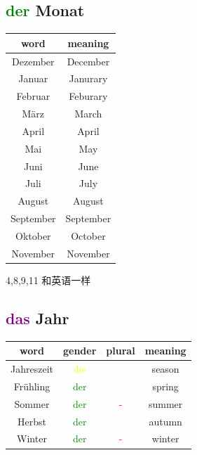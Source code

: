 \subsection{\textcolor{green}{der} Monat}
\begin{center}
    \begin{tabular}{|c|c|}
        \hline
        \rowcolor{gray}
        word      & meaning   \\
        \hline
        Dezember  & December  \\
        Januar    & Janurary  \\
        Februar   & Feburary  \\
        \hline
        März      & March     \\
        April     & April     \\
        Mai       & May       \\
        \hline
        Juni      & June      \\
        Juli      & July      \\
        August    & August    \\
        \hline
        September & September \\
        Oktober   & October   \\
        November  & November  \\
        \hline
    \end{tabular}
\end{center}

4,8,9,11 和英语一样

\subsection{\textcolor{purple}{das} Jahr}
\begin{center}
    \begin{tabular}{|c|c|c|c|}
        \hline
        \rowcolor{gray}
        word       & gender                  & plural             & meaning \\
        \hline
        Jahreszeit & \textcolor{yellow}{die} &                    & season  \\
        \hline
        Frühling   & \textcolor{green}{der}  &                    & spring  \\
        \hline
        Sommer     & \textcolor{green}{der}  & \textcolor{red}{-} & summer  \\
        \hline
        Herbst     & \textcolor{green}{der}  &                    & autumn  \\
        \hline
        Winter     & \textcolor{green}{der}  & \textcolor{red}{-} & winter  \\
        \hline
    \end{tabular}
\end{center}

